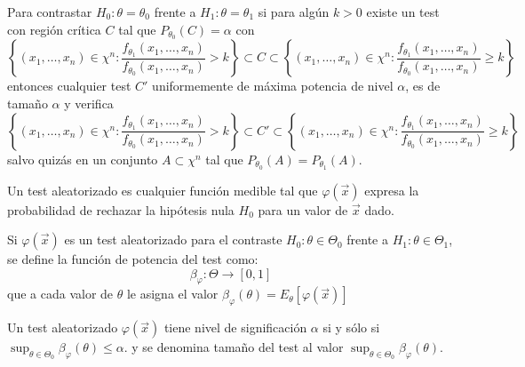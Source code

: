 \begin{teorema}
    Para contrastar $H_0: \theta = \theta_0$ frente a $H_1: \theta = \theta_1$ si para algún $k > 0$ existe un test con región crítica $C$ tal que $P_{\theta_0}(C) = \alpha$ con
    $$\left\{(x_1, \ldots, x_n) \in \chi^n : \frac{f_{\theta_1}(x_1, \ldots, x_n)}{f_{\theta_0}(x_1, \ldots, x_n)} > k \right\} \subset C \subset \left\{(x_1, \ldots, x_n) \in \chi^n : \frac{f_{\theta_1}(x_1, \ldots, x_n)}{f_{\theta_0}(x_1, \ldots, x_n)} \geq k \right\} $$
    entonces cualquier test $C \prime$ uniformemente de máxima potencia de nivel $\alpha$, es de tamaño $\alpha$ y verifica
    $$\left\{(x_1, \ldots, x_n) \in \chi^n : \frac{f_{\theta_1}(x_1, \ldots, x_n)}{f_{\theta_0}(x_1, \ldots, x_n)} > k \right\} \subset C\prime \subset \left\{(x_1, \ldots, x_n) \in \chi^n : \frac{f_{\theta_1}(x_1, \ldots, x_n)}{f_{\theta_0}(x_1, \ldots, x_n)} \geq k \right\} $$
    salvo quizás en un conjunto $A \subset \chi^n$ tal que $P_{\theta_0}(A) = P_{\theta_1}(A)$.
\end{teorema}


\begin{definición}
    Un test aleatorizado es cualquier función medible tal que $\varphi(\vec{x})$ expresa la probabilidad de rechazar la hipótesis nula $H_0$ para un valor de $\vec{x}$ dado. 
\end{definición}

\begin{definición}
    Si $\varphi(\vec{x})$ es un test aleatorizado para el contraste $H_0: \theta \in \Theta_0$ frente a $H_1: \theta \in \Theta_1$, se define la función de potencia del test como:
    $$\beta_{\varphi} : \Theta \to [0,1]$$
    que a cada valor de $\theta$ le asigna el valor $\beta_{\varphi}(\theta) = E_{\theta}[\varphi(\vec{x})]$
\end{definición}

\begin{definición}
    Un test aleatorizado $\varphi(\vec{x})$ tiene nivel de significación $\alpha$ si y sólo si $\sup_{\theta \in \Theta_0} \beta_{\varphi}(\theta) \leq \alpha$. y se denomina tamaño del test al valor $\sup_{\theta \in \Theta_0} \beta_{\varphi}(\theta)$.
\end{definición}



